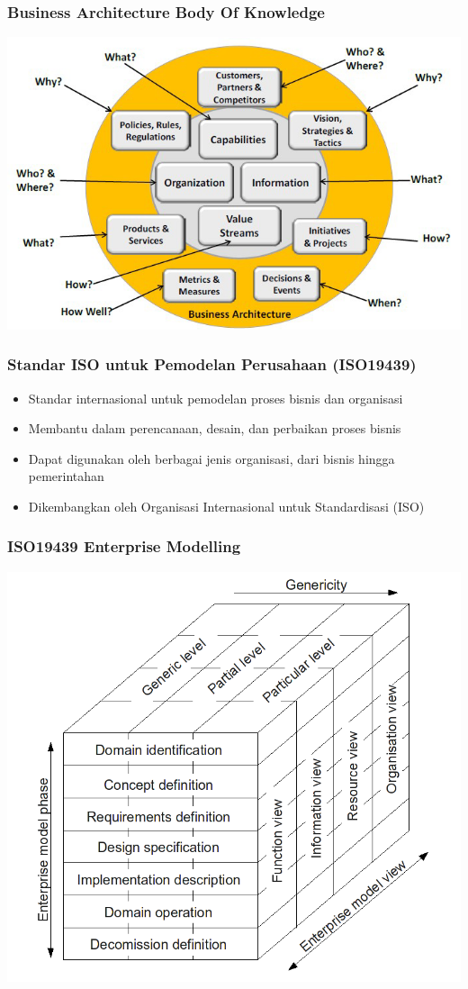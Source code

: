 \documentclass{beamer}
\begin{document}
		{
		\begin{frame}
			\frametitle{Business Architecture Body Of Knowledge}
			\begin{center}
				\includegraphics[width=1\textwidth]{../figures/bizbok}
			\end{center}
		\end{frame}
	}

	\begin{frame}
		\frametitle{Standar ISO untuk Pemodelan Perusahaan (ISO19439)}
		\begin{itemize}
			\item Standar internasional untuk pemodelan proses bisnis dan organisasi
			\item Membantu dalam perencanaan, desain, dan perbaikan proses bisnis
			\item Dapat digunakan oleh berbagai jenis organisasi, dari bisnis hingga pemerintahan
			\item Dikembangkan oleh Organisasi Internasional untuk Standardisasi (ISO)
		\end{itemize}
	\end{frame}
	
	{
		\begin{frame}
			\frametitle{ISO19439 Enterprise Modelling}
			\begin{center}
				\includegraphics[width=.75\textwidth]{../figures/iso19439}
			\end{center}
		\end{frame}
	}
\end{document}
